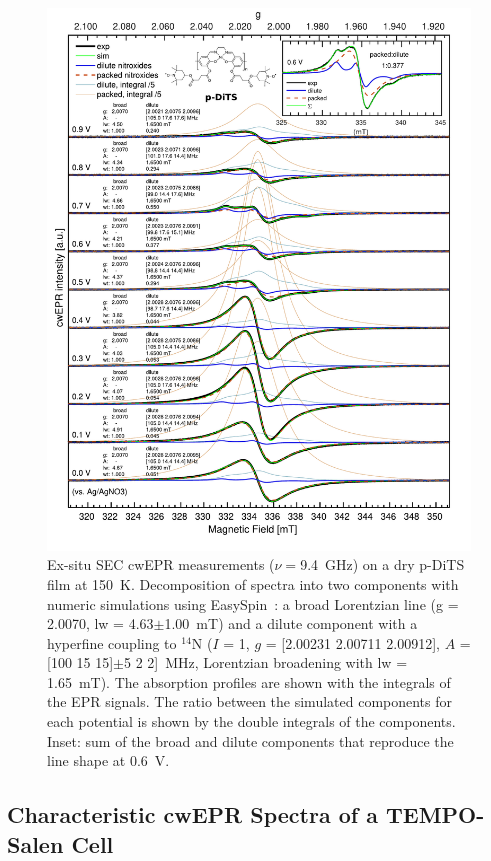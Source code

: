 \begin{figure}[h]
\center
	\includegraphics[width=1\textwidth]{./operando_epr/figures/CRYO/Figure_S7_new.pdf}
	\caption{Ex-situ SEC cwEPR measurements ($\nu=$9.4~GHz) on a dry p-DiTS film at 150~K. Decomposition of spectra into two components with numeric simulations using EasySpin~\cite{Stoll_2006}: a broad Lorentzian line (g = 2.0070, lw = 4.63$\pm$1.00~mT) and a dilute component with a hyperfine coupling to $^{14}$N ($I$ = 1, $g$ = [2.00231 2.00711 2.00912], $A$ = [100 15 15]$\pm$5 2 2]~MHz, Lorentzian broadening with lw = 1.65~mT). The absorption profiles are shown with the integrals of the EPR signals. The ratio between the simulated components for each potential is shown by the double integrals of the components. Inset: sum of the broad and dilute components that reproduce the line shape at 0.6~V.\\}
	\label{fig:cwEPR_CRYO_DiTS_CHG_SIM}
\end{figure}


\subsection{Characteristic cwEPR Spectra of a TEMPO-Salen Cell}

